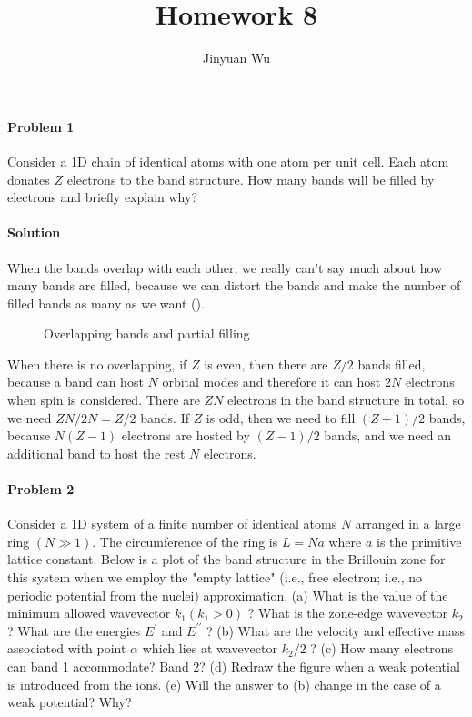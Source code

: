 \documentclass[hyperref, a4paper]{article}
\title{Homework 8}
\author{Jinyuan Wu}
\begin{document}
\maketitle

\paragraph{Problem 1} Consider a 1D chain of identical atoms with one atom per unit cell. Each atom donates $Z$ electrons to the band structure. How many bands will be filled by electrons and briefly explain why?

\paragraph{Solution} When the bands overlap with each other,
we really can't say much about how many bands are filled,
because we can distort the bands and make the number of filled bands 
as many as we want ().

\begin{figure}
    \centering
    
    \caption{Overlapping bands and partial filling}
    \label{fig:overlap}
\end{figure}

When there is no overlapping,
if $Z$ is even, then there are $Z/2$ bands filled,
because a band can host $N$ orbital modes 
and therefore it can host $2N$ electrons when spin is considered.
There are $ZN$ electrons in the band structure in total,
so we need $ZN / 2N = Z/2$ bands.
If $Z$ is odd, then we need to fill $(Z+1)/2$ bands,
because $N(Z-1)$ electrons are hosted by $(Z-1)/2$ bands,
and we need an additional band to host the rest $N$ electrons.

\paragraph{Problem 2} Consider a 1D system of a finite number of identical atoms $N$ arranged in a large ring $(N \gg 1)$. The circumference of the ring is $L=N a$ where $a$ is the primitive lattice constant. Below is a plot of the band structure in the Brillouin zone for this system when we employ the "empty lattice" (i.e., free electron; i.e., no periodic potential from the nuclei) approximation.
(a) What is the value of the minimum allowed wavevector $k_1\left(k_1>0\right)$ ?
What is the zone-edge wavevector $k_2$ ? What are the energies $E^{\prime}$ and $E^{\prime \prime}$ ?
(b) What are the velocity and effective mass associated with point $\alpha$ which lies at wavevector $k_2 / 2$ ?
(c) How many electrons can band 1 accommodate? Band 2?
(d) Redraw the figure when a weak potential is introduced from the ions.
(e) Will the answer to (b) change in the case of a weak potential? Why?
\end{document}
